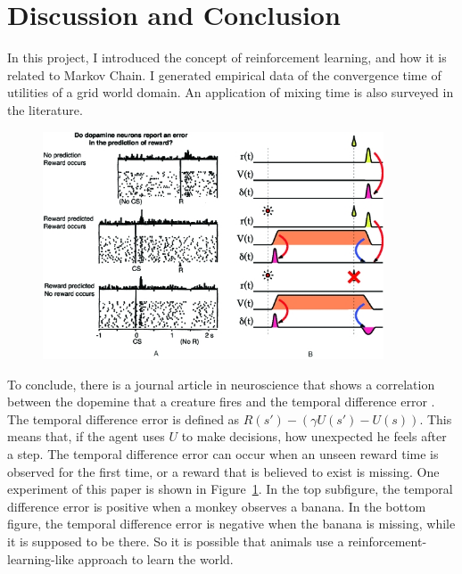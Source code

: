 \documentclass[10pt]{article}
\begin{document}
\section{Discussion and Conclusion}

In this project, I introduced the concept of reinforcement learning, and how it
is related to Markov Chain. I generated empirical data of the convergence time
of utilities of a grid world domain. An application of mixing time is also
surveyed in the literature.

\begin{figure}[h!]
\includegraphics[width=0.9\textwidth]{dopamine.jpg}
\label{fig:nat}
\end{figure}

To conclude, there is a journal article in neuroscience that shows a correlation
between the dopemine that a creature fires and the temporal difference error
\cite{tanaka2004prediction}.  The temporal difference error is defined as $R(s')
- (\gamma U(s') - U(s))$. This means that, if the agent uses $U$ to make
decisions, how unexpected he feels after a step. The temporal difference error
can occur when an unseen reward time is observed for the first time, or a reward
that is believed to exist is missing. One experiment of this paper is shown in
Figure~\ref{fig:nat}. In the top subfigure, the temporal difference error is
positive when a monkey observes a banana. In the bottom figure, the temporal
difference error is negative when the banana is missing, while it is supposed to
be there. So it is possible that animals use a reinforcement-learning-like
approach to learn the world.




\end{document}
